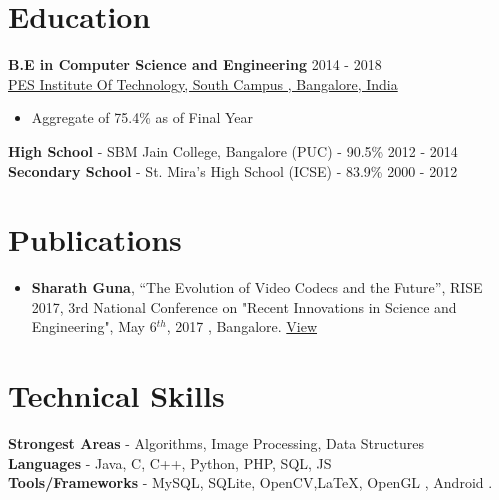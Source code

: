 \documentclass[margin, centered]{res}
\begin{document}
\begin{resume}

\section{Education}
\textbf{B.E in Computer Science and Engineering } \hfill 2014 - 2018 \\
\href{http://pesitsouth.pes.edu/}{  PES Institute Of Technology, South Campus , Bangalore, India}
\begin{itemize}
 \item Aggregate of 75.4\% as of Final Year
\end{itemize}
\textbf{High School} - {SBM Jain College, Bangalore} (PUC) - 90.5\% \hfill 2012 - 2014 \\
\textbf{Secondary School} - St. Mira's High School (ICSE) - 83.9\% \hfill 2000 - 2012


\section{Publications}
\begin{itemize}[leftmargin=*]
\item  \textbf{Sharath Guna}, ``The Evolution of Video Codecs and the Future'', RISE 2017, 3rd National Conference on "Recent Innovations in Science and Engineering", May 6$^{th}$, 2017 , Bangalore. \href{https://www.ijsr.net/conf/RISE2017/IJSR10.pdf}{View}
\end{itemize}


\section{Technical \hspace{2mm} Skills}
\textbf{Strongest Areas} - Algorithms, Image Processing, Data Structures \\
\textbf{Languages} - Java, C, C++, Python, PHP, SQL, JS\\
\textbf{Tools/Frameworks} - MySQL, SQLite, OpenCV,\LaTeX, OpenGL , Android .



\end{resume}
\end{document}

